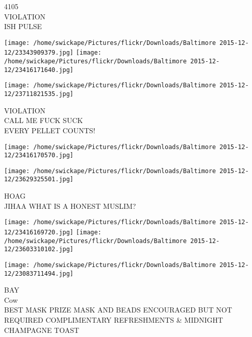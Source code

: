 \documentclass[10pt,letterpaper]{article}
\begin{document}
4105\\
VIOLATION\\
ISH PULSE\\
\pagebreak

\texttt{[image: /home/swickape/Pictures/flickr/Downloads/Baltimore 2015-12-12/23343909379.jpg]}
\texttt{[image: /home/swickape/Pictures/flickr/Downloads/Baltimore 2015-12-12/23416171640.jpg]}

\texttt{[image: /home/swickape/Pictures/flickr/Downloads/Baltimore 2015-12-12/23711821535.jpg]}

VIOLATION\\
CALL ME FUCK SUCK\\
EVERY PELLET COUNTS!\\
\pagebreak

\texttt{[image: /home/swickape/Pictures/flickr/Downloads/Baltimore 2015-12-12/23416170570.jpg]}

\vspace{0.25in}
\texttt{[image: /home/swickape/Pictures/flickr/Downloads/Baltimore 2015-12-12/23629325501.jpg]}

HOAG\\
JIHAA WHAT IS A HONEST MUSLIM?\\
\pagebreak

\texttt{[image: /home/swickape/Pictures/flickr/Downloads/Baltimore 2015-12-12/23416169720.jpg]}
\texttt{[image: /home/swickape/Pictures/flickr/Downloads/Baltimore 2015-12-12/23603310102.jpg]}

\texttt{[image: /home/swickape/Pictures/flickr/Downloads/Baltimore 2015-12-12/23083711494.jpg]}

BAY\\
Cow\\
BEST MASK PRIZE MASK AND BEADS ENCOURAGED BUT NOT REQUIRED COMPLIMENTARY REFRESHMENTS \& MIDNIGHT CHAMPAGNE TOAST\\
\pagebreak
\end{document}
